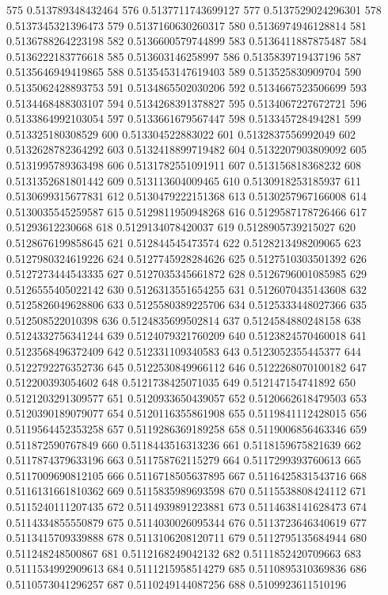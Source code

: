 575 0.513789348432464
576 0.5137711743699127
577 0.5137529024296301
578 0.5137345321396473
579 0.5137160630260317
580 0.5136974946128814
581 0.5136788264223198
582 0.5136600579744899
583 0.5136411887875487
584 0.5136222183776618
585 0.513603146258997
586 0.5135839719437196
587 0.5135646949419865
588 0.5135453147619403
589 0.513525830909704
590 0.5135062428893753
591 0.5134865502030206
592 0.5134667523506699
593 0.5134468488303107
594 0.5134268391378827
595 0.5134067227672721
596 0.5133864992103054
597 0.5133661679567447
598 0.513345728494281
599 0.513325180308529
600 0.513304522883022
601 0.5132837556992049
602 0.5132628782364292
603 0.5132418899719482
604 0.5132207903809092
605 0.5131995789363498
606 0.5131782551091911
607 0.513156818368232
608 0.5131352681801442
609 0.513113604009465
610 0.5130918253185937
611 0.5130699315677831
612 0.5130479222151368
613 0.5130257967166008
614 0.5130035545259587
615 0.5129811950948268
616 0.5129587178726466
617 0.51293612230668
618 0.5129134078420037
619 0.5128905739215027
620 0.5128676199858645
621 0.512844545473574
622 0.5128213498209065
623 0.5127980324619226
624 0.5127745928284626
625 0.5127510303501392
626 0.5127273444543335
627 0.5127035345661872
628 0.5126796001085985
629 0.5126555405022142
630 0.5126313551654255
631 0.5126070435143608
632 0.5125826049628806
633 0.5125580389225706
634 0.5125333448027366
635 0.512508522010398
636 0.5124835699502814
637 0.5124584880248158
638 0.5124332756341244
639 0.5124079321760209
640 0.5123824570460018
641 0.5123568496372409
642 0.512331109340583
643 0.5123052355445377
644 0.5122792276352736
645 0.5122530849966112
646 0.5122268070100182
647 0.512200393054602
648 0.5121738425071035
649 0.512147154741892
650 0.5121203291309577
651 0.5120933650439057
652 0.5120662618479503
653 0.5120390189079077
654 0.5120116355861908
655 0.5119841112428015
656 0.5119564452353258
657 0.5119286369189258
658 0.5119006856463346
659 0.511872590767849
660 0.5118443516313236
661 0.5118159675821639
662 0.5117874379633196
663 0.511758762115279
664 0.5117299393760613
665 0.5117009690812105
666 0.5116718505637895
667 0.5116425831543716
668 0.5116131661810362
669 0.5115835989693598
670 0.5115538808424112
671 0.5115240111207435
672 0.5114939891223881
673 0.5114638141628473
674 0.5114334855550879
675 0.5114030026095344
676 0.5113723646340619
677 0.5113415709339888
678 0.5113106208120711
679 0.5112795135684944
680 0.511248248500867
681 0.5112168249042132
682 0.5111852420709663
683 0.5111534992909613
684 0.5111215958514279
685 0.5110895310369836
686 0.5110573041296257
687 0.5110249144087256
688 0.5109923611510196
